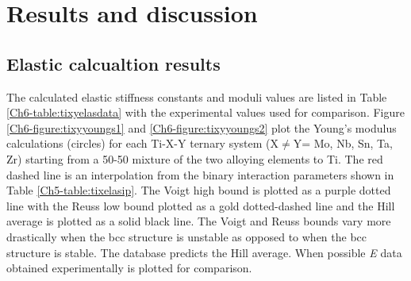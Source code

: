 \section{Results and discussion}

\subsection{Elastic calcualtion results}

The calculated elastic stiffness constants and moduli values are listed in Table \ref{Ch6-table:tixyelasdata} with the experimental values used for comparison. Figure \ref{Ch6-figure:tixyyoungs1} and \ref{Ch6-figure:tixyyoungs2} plot the Young's modulus calculations (circles) for each Ti-X-Y ternary system (X$\neq$Y= Mo, Nb, Sn, Ta, Zr) starting from a 50-50 mixture of the two alloying elements to Ti. The red dashed line is an interpolation from the binary interaction parameters shown in Table \ref{Ch5-table:tixelasip}. The Voigt high bound is plotted as a purple dotted line with the Reuss low bound plotted as a gold dotted-dashed line and the Hill average is plotted as a solid black line. The Voigt and Reuss bounds vary more drastically when the bcc structure is unstable as opposed to when the bcc structure is stable. The database predicts the Hill average.  When possible \textit{E} data obtained experimentally is plotted for comparison. 

